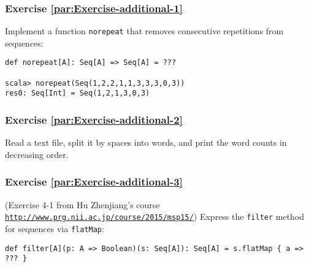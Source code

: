 \subsubsection{Exercise \label{par:Exercise-additional-1}\ref{par:Exercise-additional-1}}

Implement a function \lstinline!norepeat! that removes consecutive
repetitions from sequences:
\begin{lstlisting}
def norepeat[A]: Seq[A] => Seq[A] = ???

scala> norepeat(Seq(1,2,2,1,1,3,3,3,0,3))
res0: Seq[Int] = Seq(1,2,1,3,0,3)
\end{lstlisting}


\subsubsection{Exercise \label{par:Exercise-additional-2}\ref{par:Exercise-additional-2}}

Read a text file, split it by spaces into words, and print the word
counts in decreasing order.%
\begin{comment}
\begin{enumerate}
\item FPIS exercise 2.2: Check whether a sequence \lstinline!Seq[A]! is
sorted according to a given ordering function of type \lstinline!(A, A) => Boolean!.
\item FPIS exercise 3.24: Implement a function \lstinline!hasSubsequence!
that checks whether a \lstinline!List! contains another \lstinline!List!
as a subsequence. For instance, \lstinline!List(1,2,3,4)! would have
\lstinline!List(1,2)!, \lstinline!List(2,3)!, and \lstinline!List(4)!
as subsequences, among others. (Dynamic programming?)
\end{enumerate}
\end{comment}


\subsubsection{Exercise \label{par:Exercise-additional-3}\ref{par:Exercise-additional-3}}

(Exercise 4-1 from Hu Zhenjiang\textsf{'}s course \texttt{\href{http://www.prg.nii.ac.jp/course/2015/msp15/}{http://www.prg.nii.ac.jp/course/2015/msp15/}})
Express the \lstinline!filter! method for sequences via \lstinline!flatMap!:
\begin{lstlisting}
def filter[A](p: A => Boolean)(s: Seq[A]): Seq[A] = s.flatMap { a => ??? }
\end{lstlisting}


